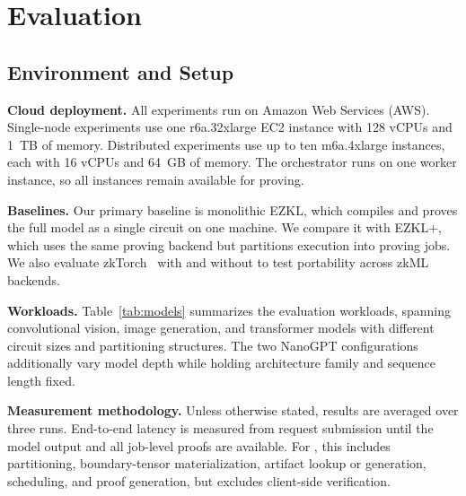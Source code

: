 \section{Evaluation}


\subsection{Environment and Setup}

\noindent\textbf{Cloud deployment.}
All experiments run on Amazon Web Services (AWS). Single-node experiments use one r6a.32xlarge EC2 instance with 128 vCPUs and 1~TB of memory. Distributed experiments use up to ten m6a.4xlarge instances, each with 16 vCPUs and 64~GB of memory. The orchestrator runs on one worker instance, so all instances remain available for proving.

\noindent\textbf{Baselines.}
Our primary baseline is monolithic EZKL, which compiles and proves the full model as a single circuit on one machine. We compare it with EZKL+\TITLE{}, which uses the same proving backend but partitions execution into proving jobs. We also evaluate zkTorch~\cite{chen2025zktorch} with and without \TITLE{} to test portability across zkML backends.

\noindent\textbf{Workloads.}
Table~\ref{tab:models} summarizes the evaluation workloads, spanning convolutional vision, image generation, and transformer models with different circuit sizes and partitioning structures. The two NanoGPT configurations additionally vary model depth while holding architecture family and sequence length fixed.

\noindent\textbf{Measurement methodology.}
Unless otherwise stated, results are averaged over three runs. End-to-end latency is measured from request submission until the model output and all job-level proofs are available. For \TITLE{}, this includes partitioning, boundary-tensor materialization, artifact lookup or generation, scheduling, and proof generation, but excludes client-side verification.



